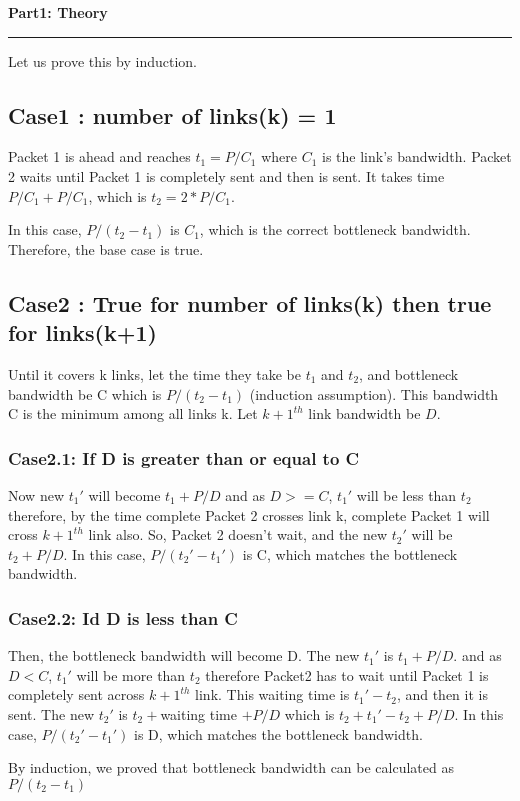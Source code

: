 \documentclass[a4paper,12pt]{article}
\title{\cooltitle{CS378 Lab-5 Report}}
\author{
    {\bf Saksham Rathi (22B1003)} \\ 
    Department of Computer Science, IIT Bombay \\ 
    \and
    {\bf Nandan Manjunath (22B0920)} \\ 
    Department of Computer Science, IIT Bombay
}
\date{}
\newenvironment{solution}[2][]{%
    \begin{mdframed}[linecolor=blue!70!black, linewidth=2pt, roundcorner=10pt, backgroundcolor=yellow!10!white, skipabove=12pt, skipbelow=12pt]%
        \textbf{\large #2}
        \par\noindent\rule{\textwidth}{0.4pt}
}{
    \end{mdframed}
}
\begin{document}
\maketitle
\begin{solution}{Part1: Theory}
    Let us prove this by induction.
    \subsection*{Case1 : number of links(k) = 1}
    Packet 1 is ahead and reaches $t_1=P/C_1$ where $C_1$ is the link's bandwidth. Packet 2 waits until Packet 1 is completely sent and then is sent. It takes time $P/C_1+P/C_1$, which is $t_2=2*P/C_1$. 

    In this case, $P/(t_2-t_1)$ is $C_1$, which is the correct bottleneck bandwidth. Therefore, the base case is true.

    \subsection*{Case2 : True for number  of links(k) then true for links(k+1)}
    Until it covers k links, let the time they take be $t_1$ and $t_2$, and bottleneck bandwidth be C which is $P/(t_2-t_1)$ (induction assumption). This bandwidth C is the minimum among all links k. Let  ${k+1}^{th}$ link bandwidth be $D$.
    \subsubsection*{Case2.1: If D is greater than or equal to C}
    Now new $t_1'$ will become $t_1+P/D$ and as $D>=C$, $t_1'$ will be less than $t_2$ therefore, by the time complete Packet 2 crosses link k, complete Packet 1 will cross  ${k+1}^{th}$ link also. So, Packet 2 doesn't wait, and the new $t_2'$ will be $t_2+P/D$. In this case, $P/(t_2'-t_1')$ is C, which matches the bottleneck bandwidth.
    \subsubsection*{Case2.2: Id D is less than C}
    Then, the bottleneck bandwidth will become D. The new $t_1'$ is $t_1+P/D$.
    and as $D<C$, $t_1'$ will be more than $t_2$ therefore Packet2 has to wait until Packet 1 is completely sent across  ${k+1}^{th}$ link. This waiting time is $t_1'-t_2$, and then it is sent. The new $t_2'$ is $t_2+$waiting time $+P/D$ which is $t_2+t_1'-t_2+P/D$. In this case, $P/(t_2'-t_1')$ is D, which matches the bottleneck bandwidth.

    By induction, we proved that bottleneck bandwidth can be calculated as $P/(t_2-t_1)$
\end{solution}
\end{document}
